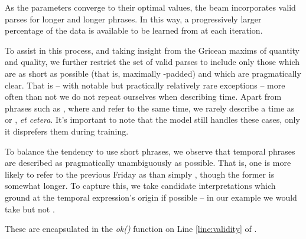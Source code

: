 As the parameters converge to their optimal values, the beam incorporates
	valid parses for longer and longer phrases.
In this way, a progressively larger percentage of the data is available to be
	learned from at each iteration.

To assist in this process, and taking insight from the Gricean 
	maxims of quantity and quality, we further restrict the set of valid 
	parses to include only those which are as short as possible
	(that is, maximally -padded) and which are pragmatically clear.
That is -- with notable but practically relatively rare exceptions --
	more often than not we do not repeat ourselves when describing time.
Apart from phrases such as , where 
	and  refer to the same time, we rarely describe a time as
	 or , \textit{et cetera}.
It's important to note that the model still handles these cases, only it
	disprefers them during training.

To balance the tendency to use short phrases, we observe that
	temporal phrases are described as pragmatically unambiguously as possible.
That is, one is more likely to refer to the previous Friday as 
	than simply , though the former is somewhat longer.
To capture this, we take candidate interpretations which ground at the
	temporal expression's origin if possible --
	in our example we would take  but not .

These are encapsulated in the \textit{ok()} function
	on Line \ref{line:validity} of .


